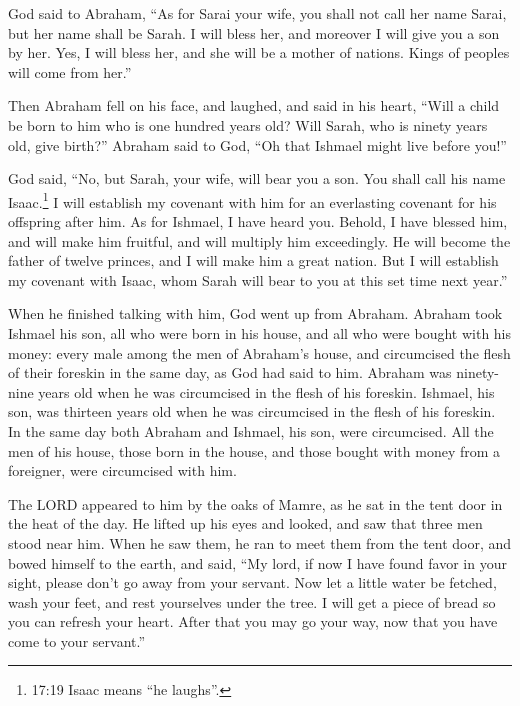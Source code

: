 \myverse{}God said to Abraham, “As for Sarai your wife, you shall not call her name Sarai, but her name shall be Sarah. \myverse{}I will bless her, and moreover I will give you a son by her. Yes, I will bless her, and she will be a mother of nations. Kings of peoples will come from her.”

\myverse{}Then Abraham fell on his face, and laughed, and said in his heart, “Will a child be born to him who is one hundred years old? Will Sarah, who is ninety years old, give birth?” \myverse{}Abraham said to God, “Oh that Ishmael might live before you!”

\myverse{}God said, “No, but Sarah, your wife, will bear you a son. You shall call his name Isaac.\footnote{17:19 Isaac means “he laughs”.} I will establish my covenant with him for an everlasting covenant for his offspring after him. \myverse{}As for Ishmael, I have heard you. Behold, I have blessed him, and will make him fruitful, and will multiply him exceedingly. He will become the father of twelve princes, and I will make him a great nation. \myverse{}But I will establish my covenant with Isaac, whom Sarah will bear to you at this set time next year.”

\myverse{}When he finished talking with him, God went up from Abraham. \myverse{}Abraham took Ishmael his son, all who were born in his house, and all who were bought with his money: every male among the men of Abraham’s house, and circumcised the flesh of their foreskin in the same day, as God had said to him. \myverse{}Abraham was ninety-nine years old when he was circumcised in the flesh of his foreskin. \myverse{}Ishmael, his son, was thirteen years old when he was circumcised in the flesh of his foreskin. \myverse{}In the same day both Abraham and Ishmael, his son, were circumcised. \myverse{}All the men of his house, those born in the house, and those bought with money from a foreigner, were circumcised with him.

\mychapter{}
\myverse*{}The LORD appeared to him by the oaks of Mamre, as he sat in the tent door in the heat of the day. \myverse{}He lifted up his eyes and looked, and saw that three men stood near him. When he saw them, he ran to meet them from the tent door, and bowed himself to the earth, \myverse{}and said, “My lord, if now I have found favor in your sight, please don’t go away from your servant. \myverse{}Now let a little water be fetched, wash your feet, and rest yourselves under the tree. \myverse{}I will get a piece of bread so you can refresh your heart. After that you may go your way, now that you have come to your servant.”

